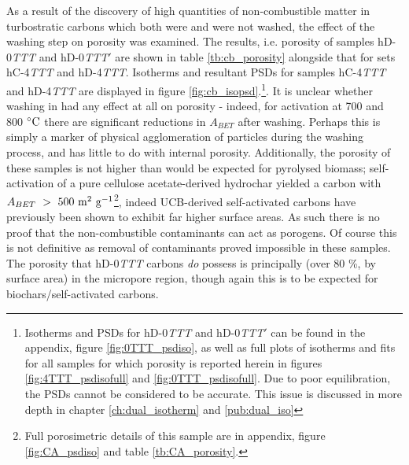 As a result of the discovery of high quantities of non-combustible matter in turbostratic carbons which both were and were not washed, the effect of the washing step on porosity was examined. The results, i.e. porosity of samples hD-0\textit{TTT} and hD-0\textit{TTT}$'$ are shown in table \ref{tb:cb_porosity} alongside that for sets hC-4\textit{TTT} and hD-4\textit{TTT}. Isotherms and resultant PSDs for samples hC-4\textit{TTT} and hD-4\textit{TTT} are displayed in figure \ref{fig:cb_isopsd}.\footnote{Isotherms and PSDs for hD-0\textit{TTT} and hD-0\textit{TTT}$'$ can be found in the appendix, figure \ref{fig:0TTT_psdiso}, as well as full plots of isotherms and fits for all samples for which porosity is reported herein in figures \ref{fig:4TTT_psdisofull} and \ref{fig:0TTT_psdisofull}. Due to poor equilibration, the PSDs cannot be considered to be accurate. This issue is discussed in more depth in chapter \ref{ch:dual_isotherm} and \ref{pub:dual_iso}}.  It is unclear whether washing in  had any effect at all on porosity - indeed, for activation at 700 and 800 $\rm ^{\circ}C$ there are significant reductions in $A_{BET}$ after washing. Perhaps this is simply a marker of physical agglomeration of particles during the washing process, and has little to do with internal porosity. Additionally, the porosity of these samples is not higher than would be expected for pyrolysed biomass; self-activation of a pure cellulose acetate-derived hydrochar yielded a carbon with $A_{BET}\ >\ 500\ \rm m^2\ g^{-1}$\footnote{Full porosimetric details of this sample are in appendix, figure \ref{fig:CA_psdiso} and table \ref{tb:CA_porosity}.}, indeed UCB-derived self-activated carbons have previously been shown to exhibit far higher surface areas.\citep{Soltani2013, Yazdi2012, Lee2014, Yu2018, Koochaki2019} As such there is no proof that the non-combustible contaminants can act as porogens. Of course this is not definitive as removal of contaminants proved impossible in these samples. The porosity that hD-0\textit{TTT} carbons \textit{do} possess is principally (over 80 \%, by surface area) in the micropore region, though again this is to be expected for biochars/self-activated carbons.\citep{Weber2018Properties, Jagiello2019Enhanced, suliman2017role}

